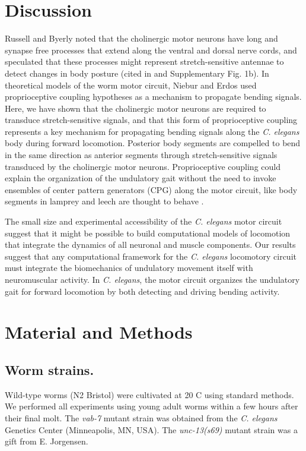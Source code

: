 \section{Discussion}
Russell and Byerly noted that the cholinergic motor neurons have long and synapse free 
processes that extend along the ventral and dorsal nerve cords, and speculated that these 
processes might represent stretch-sensitive antennae to detect changes in body posture (cited in 
 \citep{white_structure_1986,chen_neuronal_2007} and Supplementary Fig. 1b). In theoretical models of the worm motor circuit, 
Niebur and Erdos \citep{niebur_theory_1991} used proprioceptive coupling hypotheses as a mechanism to propagate 
bending signals. Here, we have shown that the cholinergic motor neurons are required to 
transduce stretch-sensitive signals, and that this form of proprioceptive coupling represents a key 
mechanism for propagating bending signals along the \textit{C. elegans} body during forward 
locomotion. Posterior body segments are compelled to bend in the same direction as anterior 
segments through stretch-sensitive signals transduced by the cholinergic motor neurons. 
Proprioceptive coupling could explain the organization of the undulatory gait without the need to 
invoke ensembles of center pattern generators (CPG) along the motor circuit, like body segments 
in lamprey and leech are thought to behave \citep{ermentrout_frequency_1984}.  
 
The small size and experimental accessibility of the \textit{C. elegans} motor circuit suggest that it might 
be possible to build computational models of locomotion that integrate the dynamics of all 
neuronal and muscle components. Our results suggest that any computational framework for the 
\textit{C. elegans} locomotory circuit must integrate the biomechanics of undulatory movement itself 
with neuromuscular activity. In \textit{C. elegans}, the motor circuit organizes the undulatory gait for forward locomotion by both detecting and driving bending activity.


\section{Material and Methods} 
 
\subsection{Worm strains.} 
Wild-type worms (N2 Bristol) were cultivated at 20 \textdegree C using standard methods. 
We performed all experiments using young adult worms within a few hours after their final molt. 
The \textit{vab-7} mutant strain was obtained from the \textit{C. elegans} Genetics Center (Minneapolis, MN, USA). The \textit{unc-13(s69)} mutant strain was a gift from E. Jorgensen. 
 
